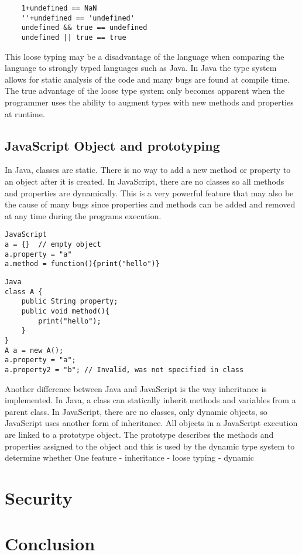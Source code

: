 \documentclass{report}
\begin{document}
	\begin{verbatim}
	1+undefined == NaN
	''+undefined == 'undefined'
	undefined && true == undefined
	undefined || true == true
	\end{verbatim}
This loose typing may be a disadvantage of the language when comparing the language to strongly typed languages such as Java. In Java the type system allows for static analysis of the code and many bugs are found at compile time. The true advantage of the loose type system only becomes apparent when the programmer uses the ability to augment types with new methods and properties at runtime.

	\subsection{JavaScript Object and prototyping}
	In Java, classes are static. There is no way to add a new method or property to an object after it is created. In JavaScript, there are no classes so all methods and properties are dynamically. This is a very powerful feature that may also be the cause of many bugs since properties and methods can be added and removed at any time during the programs execution.
\begin{verbatim}
JavaScript
a = {} 	// empty object
a.property = "a"
a.method = function(){print("hello")}
\end{verbatim}

\begin{verbatim}
Java
class A {
	public String property;
	public void method(){
		print("hello");
	}
}
A a = new A();
a.property = "a";
a.property2 = "b"; // Invalid, was not specified in class
\end{verbatim}
Another difference between Java and JavaScript is the way inheritance is implemented. In Java, a class can statically inherit methods and variables from a parent class. In JavaScript, there are no classes, only dynamic objects, so JavaScript uses another form of inheritance. All objects in a JavaScript execution are linked to a prototype object. The prototype describes the methods and properties assigned to the object and this is used by the dynamic type system to determine whether 
	One feature
	- inheritance
	- loose typing
	- dynamic


\section{Security}

\section{Conclusion}
\end{document}
